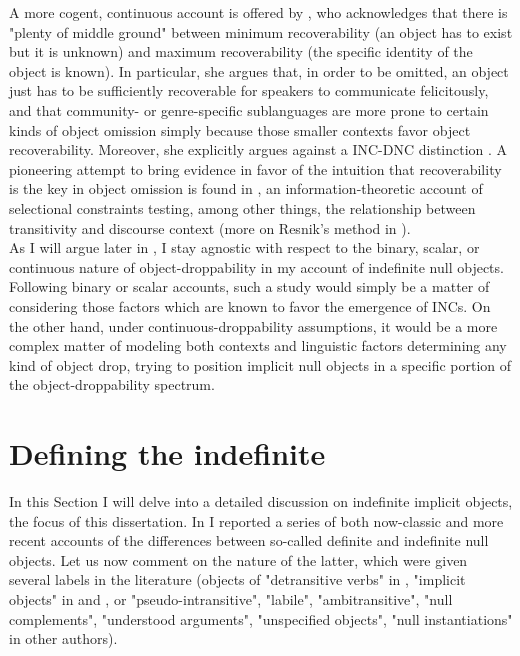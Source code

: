 A more cogent, continuous account is offered by \textcite{Glass2013}, who acknowledges that there is "plenty of middle ground" between minimum recoverability (an object has to exist but it is unknown) and maximum recoverability (the specific identity of the object is known). In particular, she argues that, in order to be omitted, an object just has to be sufficiently recoverable for speakers to communicate felicitously, and that community- or genre-specific sublanguages are more prone to certain kinds of object omission simply because those smaller contexts favor object recoverability. Moreover, she explicitly argues against a INC-DNC distinction \parencite[1]{Glass2013}. A pioneering attempt to bring evidence in favor of the intuition that recoverability is the key in object omission is found in \textcite{Resnik1993, Resnik1996}, an information-theoretic account of selectional constraints testing, among other things, the relationship between transitivity and discourse context (more on Resnik's method in ).\\
As I will argue later in , I stay agnostic with respect to the binary, scalar, or continuous nature of object-droppability in my account of indefinite null objects. Following binary or scalar accounts, such a study would simply be a matter of considering those factors which are known to favor the emergence of INCs. On the other hand, under continuous-droppability assumptions, it would be a more complex matter of modeling both contexts and linguistic factors determining any kind of object drop, trying to position implicit null objects in a specific portion of the object-droppability spectrum.


\section{Defining the indefinite} 

In this Section I will delve into a detailed discussion on indefinite implicit objects, the focus of this dissertation. In  I reported a series of both now-classic and more recent accounts of the differences between so-called definite and indefinite null objects. Let us now comment on the nature of the latter, which were given several labels in the literature (objects of "detransitive verbs" in \textcite[46]{Yasutake1987}, "implicit objects" in \textcite{Glass2013} and \textcite[29]{PethoKardos2006}, or "pseudo-intransitive", "labile", "ambitransitive", "null complements", "understood arguments", "unspecified objects", "null instantiations" in other authors).

